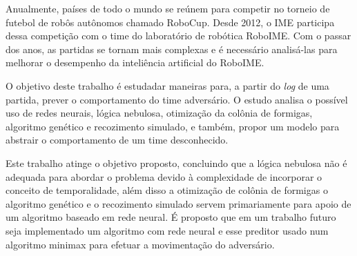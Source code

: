 \documentclass[
	12pt,				%
	oneside,			%
	a4paper,			%
	english,			%
	brazil,				%
	]{ime-abntex2}
\begin{document}

\setlength{\absparsep}{18pt} %
\begin{resumo}


Anualmente, países de todo o mundo se reúnem para competir no torneio de
futebol de robôs autônomos chamado RoboCup. Desde 2012, o IME participa dessa
competição com o time do laboratório de robótica RoboIME. Com o passar dos
anos, as partidas se tornam mais complexas e é necessário analisá-las para
melhorar o desempenho da inteliência artificial do RoboIME.

O objetivo deste trabalho é estudadar maneiras para, a partir do \textit{log}
de uma partida, prever o comportamento do time adversário. O estudo analisa o
possível uso de redes neurais, lógica nebulosa, otimização da colônia de
formigas, algoritmo genético e recozimento simulado, e também, propor um modelo
para abstrair o comportamento de um time desconhecido.

Este trabalho atinge o objetivo proposto, concluindo que a lógica nebulosa não
é adequada para abordar o problema devido à complexidade de incorporar o
conceito de temporalidade, além disso a otimização de colônia de formigas o
algoritmo genético e o recozimento simulado servem primariamente para apoio de
um algoritmo baseado em rede neural. É proposto que em um trabalho futuro seja
implementado um algoritmo com rede neural e esse preditor usado num algoritmo
minimax para efetuar a movimentação do adversário.



\end{resumo}
\end{document}
